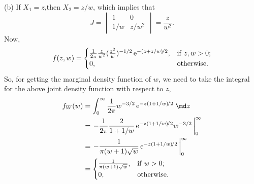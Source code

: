   (b) If $X_1=z$,then $X_2=z/w$, which implies that
        $$
      J=
        \begin{vmatrix}
          1 & 0 \\
          1/w & z/w^2
        \end{vmatrix}
      =\frac{z}{w^2}.
    $$
    Now,
    $$
      f(z,w)=
        \begin{cases}
          \frac{1}{2\pi}\frac{z}{w^2}(\frac{z^2}{w})^{-1/2}\,\mathrm{e}^{-(z+z/w)\!/2}, & \mathrm{if}\;z,w>0; \\
          0, & \mathrm{otherwise}.
        \end{cases}
    $$
  So, for getting the marginal density function of $w$, we need to take the integral for the above joint density function with respect to $z$,
    \begin{align*}
     f_W(w)&=\int_0^\infty\frac{1}{2\pi}w^{-3/2}\,\me^{-z(1+1/w)\!/2}\;\md z \\
           &=\left.-\frac{1}{2\pi}\frac{2}{1+1/w}\,\me^{-z(1+1/w)\!/2}w^{-3/2}\,\right|_0^\infty\\
           &=\left.-\frac{1}{\pi(w+1)\sqrt{w}}\,\me^{-z(1+1/w)\!/2}\,\right|_0^\infty\\
           &=\begin{cases}
              \frac{1}{\pi(w+1)\sqrt{w}}, & \mathrm{if}\; w>0; \\
              0, & \mathrm{otherwise}.
     \end{cases}
    \end{align*}
 

